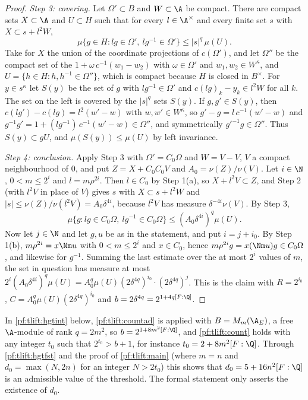 \begin{proof}
\emph{Step 3: covering.} Let $\Omega'\subset B$ and $W\subset\A$ be compact. There are compact sets $X\subset\A$ and $U\subset H$ such that for every
$l\in\A^\times$ and every finite set $s$ with $X\subset s+l^2W$,
\[
  \mu\{g\in H:lg\in\Omega',\ lg^{-1}\in\Omega'\}\le|s|^q\,\mu(U).
\]
Take for $X$ the union of the coordinate projections of $c(\Omega')$, and let $\Omega''$ be the compact set of the $1+\omega\,c^{-1}(w_1-w_2)$
with $\omega\in\Omega'$ and $w_1,w_2\in W^\kappa$, and $U=\{h\in H:h,h^{-1}\in\Omega''\}$, which is compact because $H$ is closed in $B^\times$. For
$y\in s^\kappa$ let $S(y)$ be the set of $g$ with $lg^{-1}\in\Omega'$ and $c(lg)_k-y_k\in l^2W$ for all $k$. The set on the left is covered by
the $|s|^q$ sets $S(y)$. If $g,g'\in S(y)$, then $c(lg')-c(lg)=l^2(w'-w)$ with $w,w'\in W^\kappa$, so $g'-g=l\,c^{-1}(w'-w)$ and
$g^{-1}g'=1+(lg^{-1})\,c^{-1}(w'-w)\in\Omega''$, and symmetrically $g'^{-1}g\in\Omega''$. Thus $S(y)\subset gU$, and $\mu(S(y))\le\mu(U)$ by
left invariance.

\emph{Step 4: conclusion.} Apply Step 3 with $\Omega'=C_0\Omega$ and $W=V-V$, $V$ a compact neighbourhood of $0$, and put
$Z=X+C_0C_0V$ and $A_0=\nu(Z)/\nu(V)$. Let $i\in\N$, $0<m\le2^i$ and $l=m\rho^{2i}$. Then $l\in C_0$ by Step 1(a), so $X+l^2V\subset Z$, and
Step 2 (with $l^2V$ in place of $V$) gives $s$ with $X\subset s+l^2W$ and $|s|\le\nu(Z)/\nu(l^2V)=A_0\delta^{4i}$, because $l^2V$ has
measure $\delta^{-4i}\nu(V)$. By Step 3,
\[
  \mu\{g:lg\in C_0\Omega,\ lg^{-1}\in C_0\Omega\}\le(A_0\delta^{4i})^q\mu(U).
\]
Now let $j\in\N$ and let $g,u$ be as in the statement, and put $i=j+i_0$. By Step 1(b), $m\rho^{2i}=x\Nm u$ with $0<m\le2^i$ and
$x\in C_0$, hence $m\rho^{2i}g=x(\Nm u)g\in C_0\Omega$, and likewise for $g^{-1}$. Summing the last estimate over the at most $2^i$
values of $m$, the set in question has measure at most
$2^i(A_0\delta^{4i})^q\mu(U)=A_0^q\mu(U)(2\delta^{4q})^{i_0}\cdot(2\delta^{4q})^j$. This is the claim with $R=2^{i_0}$,
$C=A_0^q\mu(U)(2\delta^{4q})^{i_0}$ and $b=2\delta^{4q}=2^{1+4q[F:\Q]}$.
\end{proof}

\begin{remark}\label{pf:tlift:remdzero}
In \cref{pf:tlift:hgtint} below, \cref{pf:tlift:countad} is applied with $B=M_m(\tliftAE)$, a free $\A$-module of rank $q=2m^2$, so
$b=2^{1+8m^2[F:\Q]}$, and \cref{pf:tlift:count} holds with any integer $t_0$ such that $2^{t_0}>b+1$, for instance
$t_0=2+8m^2[F:\Q]$. Through \cref{pf:tlift:hgtfst} and the proof of \cref{pf:tlift:main} (where $m=n$ and $d_0=\max(N,2n)$
for an integer $N>2t_0$) this shows that $d_0=5+16n^2[F:\Q]$ is an admissible value of the threshold. The formal
statement only asserts the existence of $d_0$.
\end{remark}

